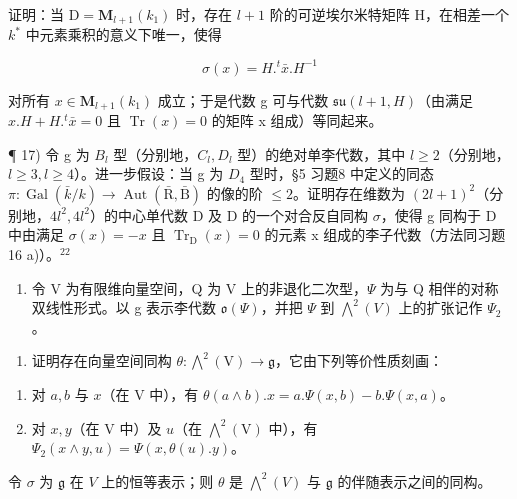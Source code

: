 证明：当 \(\mathrm{D} = \mathbf{M}_{l+1}(k_{1})\) 时，存在 \(l + 1\) 阶的可逆埃尔米特矩阵 H，在相差一个 \(k^{*}\) 中元素乘积的意义下唯一，使得

\[
\sigma (x) = H. ^ {t} \bar {x}. H ^ {- 1}
\]

对所有 \(x \in \mathbf{M}_{l+1}(k_1)\) 成立；于是代数 g 可与代数 \(\mathfrak{su}(l + 1, H)\)（由满足 \(x.H + H.^t\bar{x} = 0\) 且 \(\operatorname{Tr}(x) = 0\) 的矩阵 x 组成）等同起来。

¶ 17) 令 g 为 \(B_{l}\) 型（分别地，\(C_{l}, D_{l}\) 型）的绝对单李代数，其中 \(l \geq 2\)（分别地，\(l \geq 3, l \geq 4\)）。进一步假设：当 g 为 \(D_{4}\) 型时，§5 习题8 中定义的同态 \(\pi : \operatorname{Gal}(\bar{k}/k) \to \operatorname{Aut}(\bar{\mathrm{R}}, \bar{\mathrm{B}})\) 的像的阶 \(\leq 2\)。证明存在维数为 \((2l + 1)^{2}\)（分别地，\(4l^{2}, 4l^{2}\)）的中心单代数 D 及 D 的一个对合反自同构 \(\sigma\)，使得 g 同构于 D 中由满足 \(\sigma(x) = -x\) 且 \(\operatorname{Tr}_{\mathrm{D}}(x) = 0\) 的元素 x 组成的李子代数（方法同习题16 a)）。\(^{22}\)

\begin{enumerate}
\def\labelenumi{\arabic{enumi})}
\setcounter{enumi}{17}
\tightlist
\item
  令 V 为有限维向量空间，Q 为 V 上的非退化二次型，\(\Psi\) 为与 Q 相伴的对称双线性形式。以 g 表示李代数 \(\mathfrak{o}(\varPsi)\)，并把 \(\varPsi\) 到 \(\bigwedge^{2}(V)\) 上的扩张记作 \(\varPsi_{2}\)。
\end{enumerate}

\begin{enumerate}
\def\labelenumi{\alph{enumi})}
\tightlist
\item
  证明存在向量空间同构 \(\theta : \bigwedge^{2}(\mathrm{V}) \to \mathfrak{g}\)，它由下列等价性质刻画：
\end{enumerate}

\begin{enumerate}
\def\labelenumi{(\roman{enumi})}
\item
  对 \(a, b\) 与 \(x\)（在 \(\mathrm{V}\) 中），有 \(\theta(a \wedge b). x = a. \Psi(x, b) - b. \Psi(x, a)\)。
\item
  对 \(x, y\)（在 V 中）及 \(u\)（在 \(\bigwedge^2 (\mathrm{V})\) 中），有 \(\varPsi_2(x\wedge y,u) = \varPsi (x,\theta (u).y)\)。
\end{enumerate}

令 \(\sigma\) 为 \(\mathfrak{g}\) 在 \(V\) 上的恒等表示；则 \(\theta\) 是 \(\bigwedge^{2}(V)\) 与 \(\mathfrak{g}\) 的伴随表示之间的同构。


